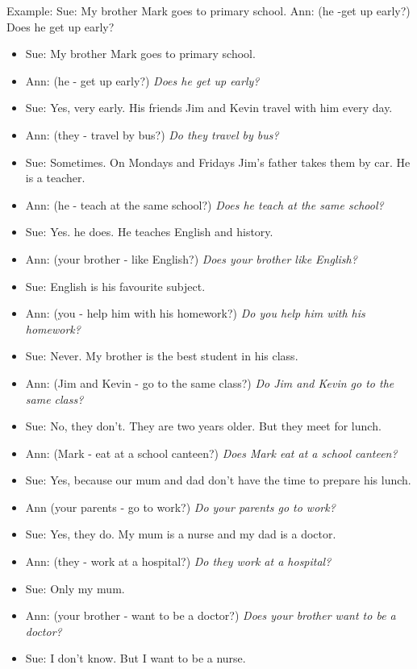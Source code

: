 Example:
Sue: My brother Mark goes to primary school. 
Ann: (he -get up early?) Does he get up early?

\begin{itemize}

\item Sue: My brother Mark goes to primary school.
\item Ann: (he - get up early?) \textit{Does he get up early?}
\item Sue: Yes, very early. His friends Jim and Kevin travel with him every day.
\item Ann: (they - travel by bus?) \textit{Do they travel by bus?}
\item Sue: Sometimes. On Mondays and Fridays Jim's father takes them by car. He is a teacher.
\item Ann: (he - teach at the same school?) \textit{Does he teach at the same school?}
\item Sue: Yes. he does. He teaches English and history.
\item Ann: (your brother - like English?) \textit{Does your brother like English?}
\item Sue: English is his favourite subject.
\item Ann: (you - help him with his homework?) \textit{Do you help him with his homework?}
\item Sue: Never. My brother is the best student in his class.
\item Ann: (Jim and Kevin - go to the same class?) \textit{Do Jim and Kevin go to the same class?}
\item Sue: No, they don't. They are two years older. But they meet for lunch.
\item Ann: (Mark - eat at a school canteen?) \textit{Does Mark eat at a school canteen?}
\item Sue: Yes, because our mum and dad don't have the time to prepare his lunch.
\item Ann (your parents - go to work?) \textit{Do your parents go to work?}
\item Sue: Yes, they do. My mum is a nurse and my dad is a doctor.
\item Ann: (they - work at a hospital?) \textit{Do they work at a hospital?}
\item Sue: Only my mum.
\item Ann: (your brother - want to be a doctor?) \textit{Does your brother want to be a doctor?}
\item Sue: I don't know. But I want to be a nurse.

\end{itemize}

